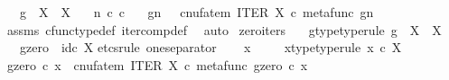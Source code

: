 \begin{isabellebody}
\ \ \ {\isachardoublequoteopen}g\ {\isacharcolon}{\kern0pt}\ X\ {\isasymrightarrow}\ X{\isachardoublequoteclose}\isanewline
\ \ \ {\isachardoublequoteopen}n\ {\isasymin}\isactrlsub c\ {\isasymnat}\isactrlsub c{\isachardoublequoteclose}\isanewline
\ \ \ {\isachardoublequoteopen}g\isactrlbsup {\isasymcirc}n\isactrlesup \ \ {\isacharequal}{\kern0pt}\ cnufatem\ {\isacharparenleft}{\kern0pt}ITER\ X\ {\isasymcirc}\isactrlsub c\ {\isasymlangle}metafunc\ g{\isacharcomma}{\kern0pt}n{\isasymrangle}{\isacharparenright}{\kern0pt}{\isachardoublequoteclose}\isanewline
%
\isadelimproof
\ \ %
\endisadelimproof
%
\isatagproof
{}\isamarkupfalse%
\ assms\ cfunc{\isacharunderscore}{\kern0pt}type{\isacharunderscore}{\kern0pt}def\ iter{\isacharunderscore}{\kern0pt}comp{\isacharunderscore}{\kern0pt}def{}\ \isamarkupfalse%
\ auto%
\endisatagproof
{\isafoldproof}%
%
\isadelimproof
\isanewline
%
\endisadelimproof
\isanewline
{}\isamarkupfalse%
\ zero{\isacharunderscore}{\kern0pt}iters{\isacharcolon}{\kern0pt}\isanewline
\ \ \ g{\isacharunderscore}{\kern0pt}type{\isacharbrackleft}{\kern0pt}type{\isacharunderscore}{\kern0pt}rule{\isacharbrackright}{\kern0pt}{\isacharcolon}{\kern0pt}\ {\isachardoublequoteopen}g\ {\isacharcolon}{\kern0pt}\ X\ {\isasymrightarrow}\ X{\isachardoublequoteclose}\isanewline
\ \ \ {\isachardoublequoteopen}g\isactrlbsup {\isasymcirc}zero\isactrlesup \ {\isacharequal}{\kern0pt}\ id\isactrlsub c\ X{\isachardoublequoteclose}\isanewline
%
\isadelimproof
%
\endisadelimproof
%
\isatagproof
{}\isamarkupfalse%
{\isacharparenleft}{\kern0pt}etcs{\isacharunderscore}{\kern0pt}rule\ one{\isacharunderscore}{\kern0pt}separator{\isacharparenright}{\kern0pt}\isanewline
\ \ \isamarkupfalse%
\ x\ \isanewline
\ \ \isamarkupfalse%
\ x{\isacharunderscore}{\kern0pt}type{\isacharbrackleft}{\kern0pt}type{\isacharunderscore}{\kern0pt}rule{\isacharbrackright}{\kern0pt}{\isacharcolon}{\kern0pt}\ {\isachardoublequoteopen}x\ {\isasymin}\isactrlsub c\ X{\isachardoublequoteclose}\isanewline
\ \ \isamarkupfalse%
\ {\isachardoublequoteopen}{\isacharparenleft}{\kern0pt}g\isactrlbsup {\isasymcirc}zero\isactrlesup {\isacharparenright}{\kern0pt}\ {\isasymcirc}\isactrlsub c\ x\ {\isacharequal}{\kern0pt}\ {\isacharparenleft}{\kern0pt}cnufatem\ {\isacharparenleft}{\kern0pt}ITER\ X\ {\isasymcirc}\isactrlsub c\ {\isasymlangle}metafunc\ g{\isacharcomma}{\kern0pt}zero{\isasymrangle}{\isacharparenright}{\kern0pt}{\isacharparenright}{\kern0pt}\ {\isasymcirc}\isactrlsub c\ x{\isachardoublequoteclose}\isanewline

\end{isabellebody}
